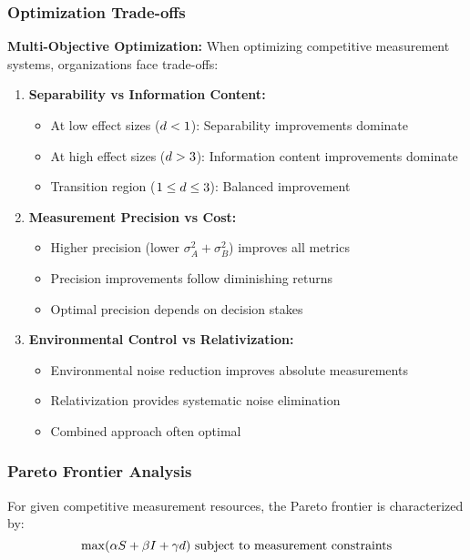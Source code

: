 \subsubsection{Optimization Trade-offs}

\textbf{Multi-Objective Optimization:}
When optimizing competitive measurement systems, organizations face trade-offs:

\begin{enumerate}
\item \textbf{Separability vs Information Content:}
   \begin{itemize}
   \item At low effect sizes ($d < 1$): Separability improvements dominate
   \item At high effect sizes ($d > 3$): Information content improvements dominate
   \item Transition region ($1 \leq d \leq 3$): Balanced improvement
   \end{itemize}

\item \textbf{Measurement Precision vs Cost:}
   \begin{itemize}
   \item Higher precision (lower $\sigma_A^2 + \sigma_B^2$) improves all metrics
   \item Precision improvements follow diminishing returns
   \item Optimal precision depends on decision stakes
   \end{itemize}

\item \textbf{Environmental Control vs Relativization:}
   \begin{itemize}
   \item Environmental noise reduction improves absolute measurements
   \item Relativization provides systematic noise elimination
   \item Combined approach often optimal
   \end{itemize}
\end{enumerate}

\subsubsection{Pareto Frontier Analysis}

\begin{theorem}
\label{thm:pareto_optimality}
For given competitive measurement resources, the Pareto frontier is characterized by:
\begin{equation}
\max(\alpha S + \beta I + \gamma d) \text{ subject to measurement constraints}
\end{equation}
\end{theorem}

